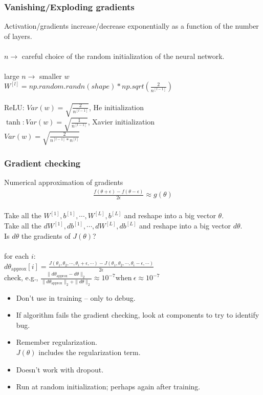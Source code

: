 \subsubsection{Vanishing/Exploding gradients}
Activation/gradients increase/decrease exponentially as a function of the number of layers.\\\\
$n \rightarrow$ careful choice of the random initialization of the neural network.\\\\
large $n \rightarrow$ smaller $w$\\
$W^{[l]} = np.random.randn(shape)*np.sqrt(\frac{2}{n^{[l-1]}})$
\\\\
ReLU: $Var(w) = \sqrt{\frac{2}{n^{[l-1]}}}$, He initialization\\
$\tanh: Var(w) = \sqrt{\frac{1}{n^{[l-1]}}}$, Xavier initialization\\
$Var(w) = \sqrt{\frac{2}{n^{[l-1]} * n^{[l]}}}$\\


\subsubsection{Gradient checking}
Numerical approximation of gradients
\begin{align*}
\frac{f(\theta +\epsilon) - f(\theta -\epsilon)}{2\epsilon} \approx g(\theta)
\end{align*}
\\
Take all the $W^{[1]}, b^{[1]}, \cdots, W^{[L]}, b^{[L]}$ and reshape into a big vector $\theta$.\\
Take all the $dW^{[1]}, db^{[1]}, \cdots, dW^{[L]}, db^{[L]}$ and reshape into a big vector $d\theta$.\\
Is $d\theta$ the gradients of $J(\theta)$?\\\\
for each $i$:\\
\indent $d\theta_{\text{approx}}[i] = \frac{J(\theta_1, \theta_2, \cdots, \theta_i + \epsilon, \cdots) - J(\theta_1, \theta_2, \cdots, \theta_i - \epsilon, \cdots) }{2\epsilon}$\\
check, e.g., $\frac{\|d\theta_{\text{approx}} - d\theta\|_2}{\|d\theta_{\text{approx}}\|_2 +\|d\theta\|_2} \approx 10^{-7} \text{when} \ \epsilon \approx 10^{-7}$
\begin{itemize}
\item
Don't use in training -- only to debug.
\item
If algorithm fails the gradient checking, look at components to try to identify bug.
\item
Remember regularization.\\
$J(\theta)$ includes the regularization term.
\item
Doesn't work with dropout.
\item
Run at random initialization; perhaps again after training.
\end{itemize}


